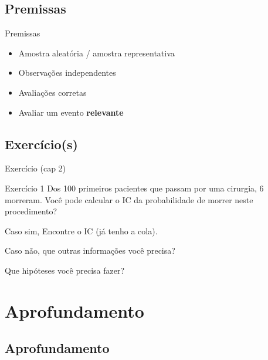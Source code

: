 \documentclass{beamer}
\begin{document}
\subsection{Premissas}

\begin{frame}{Premissas}
  \begin{itemize}
    \footnotesize
  \item Amostra aleatória / amostra representativa
  \item Observações independentes
  \item Avaliações corretas
  \item Avaliar um evento {\bf relevante}
  \end{itemize}
\end{frame}

\subsection{Exercício(s)}

\begin{frame}{Exercício (cap 2)}
  \begin{block}{Exercício 1}
    \footnotesize
    Dos 100 primeiros pacientes que passam por uma cirurgia, 6 morreram.
    Você pode calcular o IC da probabilidade de morrer neste procedimento?

    Caso sim, Encontre o IC (já tenho a cola).

    Caso não, que outras informações você precisa?

    Que hipóteses você precisa fazer?
  \end{block}
\end{frame}

\section{Aprofundamento}

\subsection{Aprofundamento}
\end{document}
